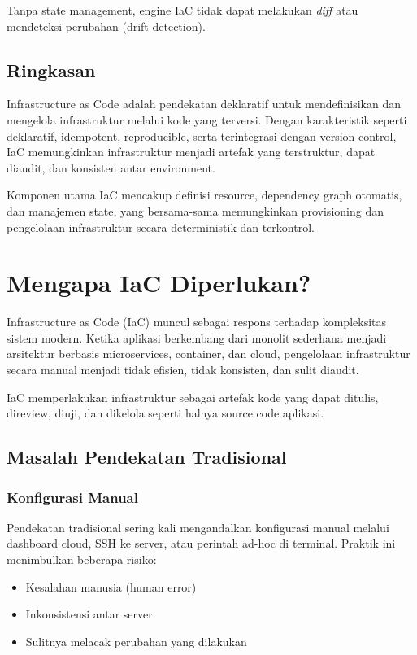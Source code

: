 Tanpa state management, engine IaC tidak dapat melakukan \textit{diff} atau mendeteksi perubahan (drift detection).

\subsection*{Ringkasan}

Infrastructure as Code adalah pendekatan deklaratif untuk mendefinisikan dan mengelola infrastruktur melalui kode yang terversi. Dengan karakteristik seperti deklaratif, idempotent, reproducible, serta terintegrasi dengan version control, IaC memungkinkan infrastruktur menjadi artefak yang terstruktur, dapat diaudit, dan konsisten antar environment.

Komponen utama IaC mencakup definisi resource, dependency graph otomatis, dan manajemen state, yang bersama-sama memungkinkan provisioning dan pengelolaan infrastruktur secara deterministik dan terkontrol.

\section{Mengapa IaC Diperlukan?}

Infrastructure as Code (IaC) muncul sebagai respons terhadap kompleksitas sistem modern. Ketika aplikasi berkembang dari monolit sederhana menjadi arsitektur berbasis microservices, container, dan cloud, pengelolaan infrastruktur secara manual menjadi tidak efisien, tidak konsisten, dan sulit diaudit.

IaC memperlakukan infrastruktur sebagai artefak kode yang dapat ditulis, direview, diuji, dan dikelola seperti halnya source code aplikasi.

\subsection{Masalah Pendekatan Tradisional}

\subsubsection*{Konfigurasi Manual}

Pendekatan tradisional sering kali mengandalkan konfigurasi manual melalui dashboard cloud, SSH ke server, atau perintah ad-hoc di terminal. Praktik ini menimbulkan beberapa risiko:

\begin{itemize}
\item Kesalahan manusia (human error)
\item Inkonsistensi antar server
\item Sulitnya melacak perubahan yang dilakukan
\end{itemize}

